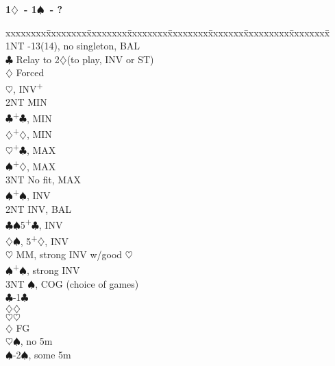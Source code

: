 \documentclass[10pt]{article}
\renewcommand{\c}{$\clubsuit$}
\renewcommand{\d}{$\diamondsuit$}
\newcommand{\h}{$\heartsuit$}
\newcommand{\s}{$\spadesuit$}
\newcommand{\p}{\textsuperscript{+}}
\newenvironment{bidtable}[1][]
{\textbf{#1}
  \begin{adjustwidth}{1em}{}
    \addvspace{2pt}
    \begin{tabbing}
      xxxxxxxx\=xxxxxxxx\=xxxxxxxx\=xxxxxxxx\=xxxxxxxx\=xxxxxxx\=xxxxxxxxx\=xxxxxxxx\=\kill}
{\end{tabbing}\end{adjustwidth}\bigskip}%
\begin{document}
\begin{bidtable}[1\d\ - 1\s\ - ?]
1NT  -13(14), no singleton, BAL                                 \\
     \c  \> Relay to 2\d (to play, INV or ST)                    \\
     \>      \d \> Forced                                        \\
     \>      \>     \h  {}, INV\p                           \\
     \>      \>     \>      \> 2NT   \> MIN                          \\
     \>      \>     \>      \c   {}\p\c, MIN                   \\
     \>      \>     \>      \d   {}\p\d, MIN                   \\
     \>      \>     \>      \h   {}\p\c, MAX                   \\
     \>      \>     \>      \s   {}\p\d, MAX                   \\
     \>      \>     \>      \> 3NT   \> No fit, MAX                  \\
     \>      \>     \s  {}\p\s, INV                            \\
     \>      \>     \> 2NT  \> INV, BAL                              \\
     \>      \>     \c  {}\s 5\p\c, INV                        \\
     \>      \>     \d  {}\s, 5\p\d, INV                       \\
     \>      \>     \h  {} MM, strong INV w/good \h           \\
     \>      \>     \s  {}\p\s, strong INV                     \\
     \>      \>     \> 3NT  \s, COG (choice of games)            \\
     \>      \>     \c  {}-1\c                                 \\
     \>      \>     \d  {}\d                                   \\
     \>      \>     \h  {}\h                                   \\
     \d  \> FG                                                   \\
     \>      \h {}\s, no 5m                                    \\
     \>      \s {}-2\s, some 5m                                \\

\end{bidtable}
\end{document}
